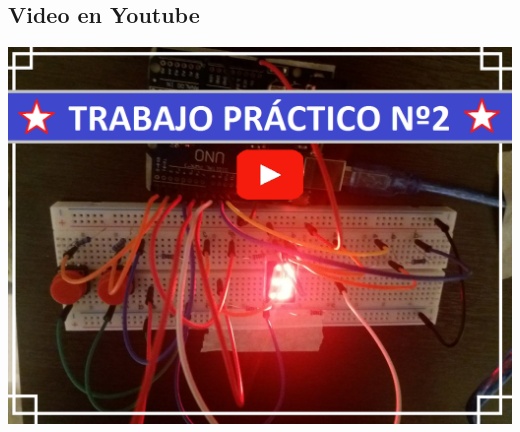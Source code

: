 
\subsection{Video en Youtube}
\begin{center}
\href{https://youtu.be/xjCqE8HniWs}{\includegraphics[width=.8\linewidth]{imagenes/VIDEO TP2.png}}
\end{center}

